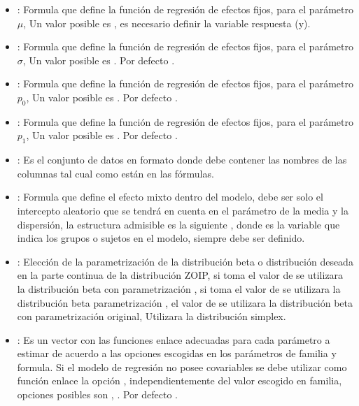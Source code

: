 \begin{itemize}[noitemsep, nolistsep]

\item {}: Formula que define la funci\'{o}n de regresi\'{o}n de efectos fijos, para el par\'{a}metro $\mu$, Un valor posible es , es necesario definir la variable respuesta (y).
\item {}: Formula que define la funci\'{o}n de regresi\'{o}n de efectos fijos, para el par\'{a}metro $\sigma$, Un valor posible es . Por defecto .
\item {}: Formula que define la funci\'{o}n de regresi\'{o}n de efectos fijos, para el par\'{a}metro $p_0$, Un valor posible es . Por defecto .
\item {}: Formula que define la funci\'{o}n de regresi\'{o}n de efectos fijos, para el par\'{a}metro $p_1$, Un valor posible es . Por defecto .
\item {}: Es el conjunto de datos en formato  donde debe contener las nombres de las columnas tal cual como est\'{a}n en las f\'{o}rmulas.
\item {}: Formula que define el efecto mixto dentro del modelo, debe ser solo el intercepto aleatorio que se tendr\'{a} en cuenta en el par\'{a}metro de la media y la dispersi\'{o}n, la estructura admisible es la siguiente , donde  es la variable que indica los grupos o sujetos en el modelo, siempre debe ser definido.
\item {}: Elecci\'{o}n de la parametrizaci\'{o}n de la distribuci\'{o}n beta o distribuci\'{o}n deseada en la parte continua de la distribuci\'{o}n ZOIP, si toma el valor de  se utilizara la distribuci\'{o}n beta con parametrizaci\'{o}n  \cite{Stasinopoulos2}, si toma el valor de  se utilizara la distribuci\'{o}n beta parametrizaci\'{o}n \cite{Ferrari2}, el valor de  se utilizara la distribuci\'{o}n beta con parametrizaci\'{o}n original,  Utilizara la distribuci\'{o}n simplex.
\item {}: Es un vector con las funciones enlace adecuadas para cada par\'{a}metro a estimar de acuerdo a las opciones escogidas en los par\'{a}metros de familia y formula. Si el modelo de regresi\'{o}n no posee covariables se debe utilizar como funci\'{o}n enlace la opci\'{o}n , independientemente del valor escogido en familia, opciones posibles son , . Por defecto .

\end{itemize}
